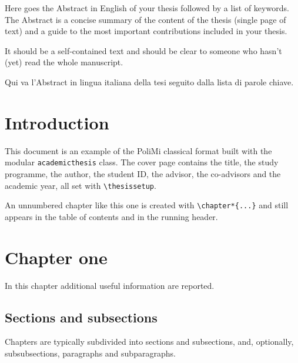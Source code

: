 \documentclass[university=polimi, master, format=classic, language=english]{academicthesis}
\begin{document}
\frontpage

\frontmatter

\begin{abstractthesis}[keywords = {here, the keywords, of your thesis}]
  Here goes the Abstract in English of your thesis followed by a list of
  keywords. The Abstract is a concise summary of the content of the thesis
  (single page of text) and a guide to the most important contributions
  included in your thesis.

  It should be a self-contained text and should be clear to someone who
  hasn't (yet) read the whole manuscript.
\end{abstractthesis}

\begin{abstractthesis}[language = italian,
                       keywords = {qui, vanno, le parole chiave, della tesi}]
  Qui va l'Abstract in lingua italiana della tesi seguito dalla lista di
  parole chiave.
\end{abstractthesis}

\tableofcontents

\mainmatter

\chapter*{Introduction}
This document is an example of the PoliMi classical format built with the
modular \texttt{academicthesis} class. The cover page contains the title,
the study programme, the author, the student ID, the advisor, the
co-advisors and the academic year, all set with \verb|\thesissetup|.

An unnumbered chapter like this one is created with \verb|\chapter*{...}|
and still appears in the table of contents and in the running header.

\chapter{Chapter one}
\label{ch:chapter_one}
In this chapter additional useful information are reported.

\section{Sections and subsections}
Chapters are typically subdivided into sections and subsections, and,
optionally, subsubsections, paragraphs and subparagraphs.
\end{document}
